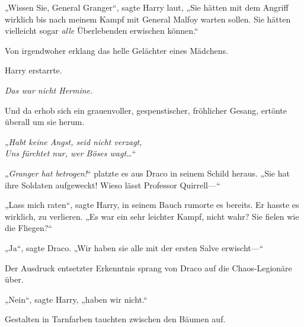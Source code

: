 „Wissen Sie, General Granger“, sagte Harry laut, „Sie hätten mit dem Angriff wirklich bis nach meinem Kampf mit General Malfoy warten sollen. Sie hätten vielleicht sogar \emph{alle} Überlebenden erwischen können.“

Von irgendwoher erklang das helle Gelächter eines Mädchens.

Harry erstarrte.

\emph{Das war nicht Hermine.}

Und da erhob sich ein grauenvoller, gespenstischer, fröhlicher Gesang, ertönte überall um sie herum.

„\emph{Habt keine Angst, seid nicht verzagt,\\
Uns fürchtet nur, wer Böses wagt…}“

„\emph{Granger hat betrogen!}“ platzte es aus Draco in seinem Schild heraus. „Sie hat ihre Soldaten aufgeweckt! Wieso lässt Professor Quirrell—“

„Lass mich raten“, sagte Harry, in seinem Bauch rumorte es bereits. Er hasste es wirklich, zu verlieren. „Es war ein sehr leichter Kampf, nicht wahr? Sie fielen wie die Fliegen?“

„Ja“, sagte Draco. „Wir haben sie alle mit der ersten Salve erwischt—“

Der Ausdruck entsetzter Erkenntnis sprang von Draco auf die Chaos-Legionäre über.

„Nein“, sagte Harry, „haben wir nicht.“

Gestalten in Tarnfarben tauchten zwischen den Bäumen auf.

